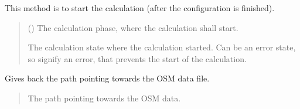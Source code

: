 \documentclass[letterpaper,10pt,english]{sphinxmanual}
\begin{document}
\begin{fulllineitems}
\begin{fulllineitems}
\label{\detokenize{apidoc/src.osm_configurator.model.application:src.osm_configurator.model.application.application_interface.IApplication.start_calculation}}
\pysigstartsignatures
{}
\pysigstopsignatures
\sphinxAtStartPar
This method is to start the calculation (after the configuration is finished).
\begin{quote}\begin{description}
\sphinxAtStartPar
{} ({\hyperref[\detokenize{apidoc/src.osm_configurator.model.project.calculation:src.osm_configurator.model.project.calculation.calculation_phase_enum.CalculationPhase}]{}}) \textendash{} The calculation phase, where the calculation shall start.

\sphinxAtStartPar
The calculation state where the calculation started. Can be an error state, so signify an error, that prevents the start of the calculation.

\sphinxAtStartPar
{\hyperref[\detokenize{apidoc/src.osm_configurator.model.project.calculation:src.osm_configurator.model.project.calculation.calculation_state_enum.CalculationState}]{}}

\end{description}\end{quote}

\end{fulllineitems}


\begin{fulllineitems}
\label{\detokenize{apidoc/src.osm_configurator.model.application:src.osm_configurator.model.application.application_interface.IApplication.get_osm_data}}
\pysigstartsignatures
{}
\pysigstopsignatures
\sphinxAtStartPar
Gives back the path pointing towards the OSM data file.
\begin{quote}\begin{description}
\sphinxAtStartPar
The path pointing towards the OSM data.


\end{description}
\end{quote}
\end{fulllineitems}
\end{fulllineitems}
\end{document}
